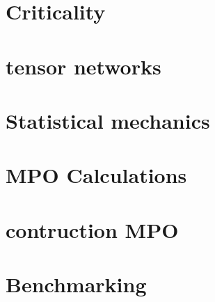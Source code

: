 \documentclass{article}
\begin{document}
\section{Criticality}


\section{tensor networks}


\section{Statistical mechanics}


\section{MPO Calculations}


\section{contruction MPO}



\section{Benchmarking}




\end{document}
